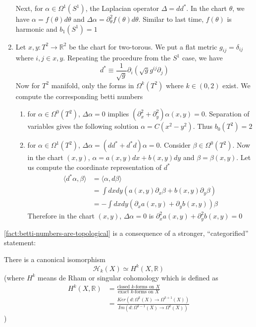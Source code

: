 \documentclass[12pt,letterpaper,reqno]{article}
\numberwithin{equation}{section}
\newcommand{\cH}{\ensuremath{\mathcal H}}
\newcommand{\R}{\ensuremath{\mathbb R}}
\begin{document}
\begin{solution}
\begin{enumerate}
Next, for $\alpha\in\Omega^1(S^1)$, the Laplacian operator $\Delta = dd^*$.  In the chart $\theta$, we have $\alpha = f(\theta)d\theta$ and $\Delta\alpha=\partial_\theta^2f(\theta)d\theta$.  Similar to last time, $f(\theta)$ is harmonic and $b_1(S^1)=1$
\item Let $x,y:T^2\to\mathbb{R}^2$ be the chart for two-torous.  We put a flat metric $g_{ij}=\delta_{ij}$ where $i,j\in x,y$.  Repeating the procedure from the $S^1$ case, we have
  \begin{equation}
    d^*\equiv \frac{1}{\sqrt{g}}\partial_i(\sqrt{g}g^{ij}\partial_j)
  \end{equation}
Now for $T^2$ manifold, only the forms in $\Omega^k(T^2)$ where $k\in (0,2)$ exist.  We compute the corresponding betti numbers 
\begin{enumerate}
\item for $\alpha\in\Omega^0(T^2)$, $\Delta\alpha=0$ implies $(\partial^2_x+\partial^2_y)\alpha(x,y)=0$.  Separation of variables gives the following solution $\alpha=C(x^2-y^2)$.  Thus $b_0(T^2)=2$
\item for $\alpha\in\Omega^1(T^2)$, $\Delta\alpha=(dd^*+d^*d)\alpha=0$. Consider $\beta\in\Omega^0(T^2)$.  Now in the chart $(x,y)$, $\alpha = a(x,y)dx+b(x,y)dy$ and $\beta = \beta(x,y)$.  Let us compute the coordinate representation of $d^*$
  \begin{equation}
    \begin{split}
      \langle d^*\alpha,\beta\rangle &= \langle\alpha,d\beta\rangle\\
      &=\int dxdy(a(x,y)\partial_x\beta+b(x,y)\partial_y\beta)\\
      &=-\int dxdy(\partial_xa(x,y)+\partial_yb(x,y))\beta 
    \end{split}
  \end{equation}
Therefore in the chart $(x,y)$, $\Delta\alpha=0$ is $\partial_x^2a(x,y)+\partial_y^2b(x,y)=0$
\end{enumerate}
\end{enumerate}
\end{solution}

\autoref{fact:betti-numbers-are-topological}
is a consequence of a stronger, ``categorified'' statement:
\begin{fact} There is a canonical isomorphism
\begin{equation}
  \cH_k(X) \simeq H^k(X,\R)
\end{equation}
(where $H^k$ means de Rham or singular cohomology which is defined as 
\begin{equation}
\begin{split}
  H^k(X,\R) &= \frac{\text{closed $k$-forms on $X$}}{\text{exact $k$-forms on $X$}} \\
            &= \frac{Ker(d:\Omega^k(X)\to\Omega^{k+1}(X))}{Im(d:\Omega^{k-1}(X)\to\Omega^k(X))}
\end{split}
\end{equation})
\end{fact}
\end{document}
